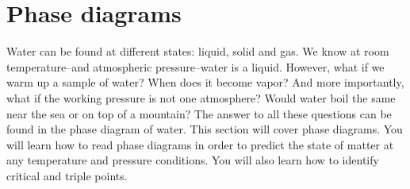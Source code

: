 \documentclass[main.tex]{subfiles}
\begin{document}
\section{Phase diagrams}
Water can be found at different states: liquid, solid and gas. We know at room temperature--and atmospheric pressure--water is a liquid. However, what if we warm up a sample of water? When does it become vapor? And more importantly, what if the working pressure is not one atmosphere? Would water boil the same near the sea or on top of a mountain? The answer to all these questions can be found in the phase diagram of water. This section will cover phase diagrams. You will learn how to read phase diagrams in order to predict the state of matter at any temperature and pressure conditions. You will also learn how to identify critical and triple points.
\end{document}
